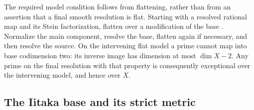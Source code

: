 The required model condition follows from flattening, rather than from
an assertion that a final smooth resolution is flat.  Starting with a
resolved rational map and its Stein factorization, flatten over a
modification of the base \cite[Theorem~5.2.2]{RaynaudGruson1971}.
Normalize the main component, resolve the base, flatten again if
necessary, and then resolve the source.  On the intervening
flat model a prime cannot map into base codimension two: its inverse
image has dimension at most $\dim X-2$.  Any prime on the final
resolution with that property is consequently exceptional over the
intervening model, and hence over $X$.

\subsection{The Iitaka base and its strict metric}
\label{conv:iitaka}

